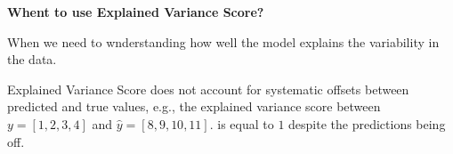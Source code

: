 \textbf{Whent to use Explained Variance Score?}

When we need to wnderstanding how well the model explains the variability in the data.

{
    \item Explained Variance Score does not account for systematic offsets between predicted and true values, e.g., the explained variance score between 
    \( y=[1, 2, 3, 4] \) and \( \hat{y}=[8, 9, 10, 11] \). is equal to $1$ despite the predictions being off.
}

